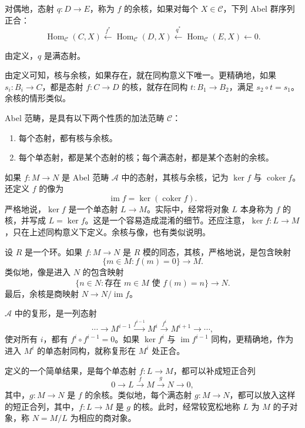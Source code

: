 \begin{definition*}\label{def:4.categorical-cokernel}
对偶地，态射 $q\colon D\to E$，称为 $f$ 的余核，如果对每个 $X\in\mathcal{C}$，下列 Abel 群序列正合：
\[
\operatorname{Hom}_{\mathcal{C}}(C,X)
\xleftarrow{f^*}\operatorname{Hom}_{\mathcal{C}}(D,X)
\xleftarrow{q^*}\operatorname{Hom}_{\mathcal{C}}(E,X)
\longleftarrow0.
\]
\end{definition*}
由定义，$q$ 是满态射。

由定义可知，核与余核，如果存在，就在同构意义下唯一。更精确地，如果 $s_i\colon B_i\to C$，都是态射 $f\colon C\to D$ 的核，就存在同构 $t\colon B_1\to B_2$，满足 $s_2\circ t=s_1$。余核的情形类似。

\begin{definition}\label{def:4.17}
Abel 范畴，是具有以下两个性质的加法范畴 $\mathcal{C}$：
\begin{enumerate}[label=(\alph*)]
\item 每个态射，都有核与余核。
\item 每个单态射，都是某个态射的核；每个满态射，都是某个态射的余核。
\end{enumerate}
\end{definition}

如果 $f\colon M\to N$ 是 Abel 范畴 $\mathcal{A}$ 中的态射，其核与余核，记为 $\ker f$ 与 $\operatorname{coker}f$。还定义 $f$ 的像为
\[
\operatorname{im}f=\ker(\operatorname{coker}f).
\]
严格地说，$\ker f$ 是一个单态射 $L\to M$。实际中，经常将对象 $L$ 本身称为 $f$ 的核，并写成 $L=\ker f$。这是一个容易造成混淆的细节。还应注意，$\ker f\colon L\to M$，只在上述同构意义下定义。余核与像，也有类似说明。

\begin{example}\label{ex:4.18}
设 $R$ 是一个环。如果 $f\colon M\to N$ 是 $R$ 模的同态，其核，严格地说，是包含映射
\[
\{m\in M:f(m)=0\}\longrightarrow M.
\]
类似地，像是进入 $N$ 的包含映射
\[
\{n\in N:\text{存在 }m\in M\text{ 使 }f(m)=n\}\longrightarrow N.
\]
最后，余核是商映射 $N\to N/\operatorname{im}f$。
\end{example}

\begin{definition*}\label{def:4.complex-exact-sequence}
$\mathcal{A}$ 中的复形，是一列态射
\[
\cdots\longrightarrow M^{i-1}\xrightarrow{f^{i-1}}M^i
\xrightarrow{f^i}M^{i+1}\longrightarrow\cdots,
\]
使对所有 $i$，都有 $f^i\circ f^{i-1}=0$。如果 $\ker f^i$ 与 $\operatorname{im}f^{i-1}$ 同构，更精确地，作为进入 $M^i$ 的单态射同构，就称复形在 $M^i$ 处正合。
\end{definition*}
定义的一个简单结果，是每个单态射 $f\colon L\to M$，都可以补成短正合列
\[
0\longrightarrow L\xrightarrow{f}M\xrightarrow{g}N\longrightarrow0,
\]
其中，$g\colon M\to N$ 是 $f$ 的余核。类似地，每个满态射 $g\colon M\to N$，都可以放入这样的短正合列，其中，$f\colon L\to M$ 是 $g$ 的核。此时，经常较宽松地称 $L$ 为 $M$ 的子对象，称 $N=M/L$ 为相应的商对象。

